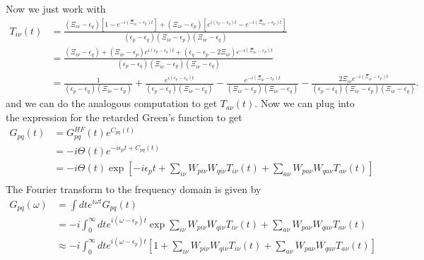 Now we just work with
\begin{align}
    T_{i\nu}(t) &= \frac{ \left( \Xi_{i\nu} - \epsilon_q \right) \left[ 1 - e^{-i(\Xi_{i\nu} - \epsilon_p)t} \right] + \left( \Xi_{i\nu} - \epsilon_p \right) \left[ e^{i\left(\epsilon_p - \epsilon_q\right)t} - e^{-i(\Xi_{i\nu} - \epsilon_p)t} \right] }{ (\epsilon_p - \epsilon_q)(\Xi_{i\nu} - \epsilon_p)(\Xi_{i\nu} - \epsilon_q) } \\
&= \frac{ \left( \Xi_{i\nu} - \epsilon_q \right) + \left( \Xi_{i\nu} - \epsilon_p \right) e^{i\left(\epsilon_p - \epsilon_q\right)t} + \left( \epsilon_q - \epsilon_p - 2\Xi_{i\nu} \right) e^{-i(\Xi_{i\nu} - \epsilon_p)t} }{ (\epsilon_p - \epsilon_q)(\Xi_{i\nu} - \epsilon_p)(\Xi_{i\nu} - \epsilon_q) } \\
&= \frac{1}{\left(\epsilon_p-\epsilon_q\right)\left(\Xi_{i\nu}-\epsilon_p\right)}+\frac{e^{i\left(\epsilon_p-\epsilon_q\right) t}}{\left(\epsilon_p-\epsilon_q\right)\left(\Xi_{i\nu}-\epsilon_q\right)}-\frac{e^{-i\left(\Xi_{i\nu}-\epsilon_p\right) t}}{\left(\Xi_{i\nu}-\epsilon_p\right)\left(\Xi_{i\nu}-\epsilon_q\right)}-\frac{2 \Xi_{i\nu} e^{-i\left(\Xi_{i\nu}-\epsilon_p\right) t}}{\left(\epsilon_p-\epsilon_q\right)\left(\Xi_{i\nu}-\epsilon_p\right)(\Xi_{i\nu}-\epsilon_q)} .
\end{align}
and we can do the analogous computation to get $T_{a\nu}(t)$.
Now we can plug into the expression for the retarded Green's function to get
\begin{align}
    G_{pq}(t) & = G_{pq}^{HF}(t) e^{C_{pq}(t)} \\
& = -i \Theta(t) e^{-i \epsilon_p t + C_{pq}(t)} \\
& = -i \Theta(t) \exp\left[-i \epsilon_p t + \sum_{i\nu} W_{p i \nu} W_{q i \nu} T_{i\nu}(t) + \sum_{a\nu} W_{p a \nu} W_{q a \nu} T_{a\nu}(t) \right] \\
\end{align}
The Fourier transform to the frequency domain is given by
\begin{align}
    G_{pq}(\omega) &= \int dt e^{i\omega t} G_{pq}(t) \\
&= -i \int_0^\infty dt e^{i(\omega - \epsilon_p) t} \exp{\sum_{i\nu} W_{p i \nu} W_{q i \nu} T_{i\nu}(t) + \sum_{a\nu} W_{p a \nu} W_{q a \nu} T_{a\nu}(t)} \\
&\approx -i \int_0^\infty dt e^{i(\omega - \epsilon_p) t} \left[1 + \sum_{i\nu} W_{p i \nu} W_{q i \nu} T_{i\nu}(t) + \sum_{a\nu} W_{p a \nu} W_{q a \nu} T_{a\nu}(t) \right] \\
\end{align}
